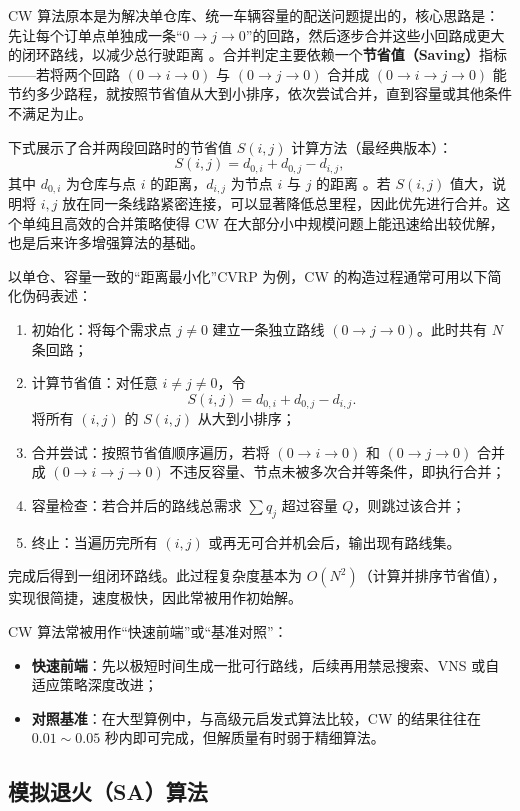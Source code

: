\documentclass[12pt,a4paper,twoside]{ctexbook}
\begin{document}
CW 算法原本是为解决单仓库、统一车辆容量的配送问题提出的，核心思路是：先让每个订单点单独成一条“$0 \to j \to 0$”的回路，然后逐步合并这些小回路成更大的闭环路线，以减少总行驶距离 \cite{golden2008vehicle}。合并判定主要依赖一个\textbf{节省值（Saving）}指标——若将两个回路 $(0 \to i \to 0)$ 与 $(0 \to j \to 0)$ 合并成 $(0 \to i \to j \to 0)$ 能节约多少路程，就按照节省值从大到小排序，依次尝试合并，直到容量或其他条件不满足为止。

下式展示了合并两段回路时的节省值 $S(i,j)$ 计算方法（最经典版本）：
\[
S(i,j) = d_{0,i} + d_{0,j} - d_{i,j},
\]
其中 $d_{0,i}$ 为仓库与点 $i$ 的距离，$d_{i,j}$ 为节点 $i$ 与 $j$ 的距离 \cite{laporte2009fifty}。若 $S(i,j)$ 值大，说明将 $i,j$ 放在同一条线路紧密连接，可以显著降低总里程，因此优先进行合并。这个单纯且高效的合并策略使得 CW 在大部分小中规模问题上能迅速给出较优解，也是后来许多增强算法的基础。

以单仓、容量一致的“距离最小化”CVRP 为例，CW 的构造过程通常可用以下简化伪码表述：
\begin{enumerate}
    \item 初始化：将每个需求点 $j \neq 0$ 建立一条独立路线 $(0 \to j \to 0)$。此时共有 $N$ 条回路；
    \item 计算节省值：对任意 $i \neq j \neq 0$，令
    \[
    S(i,j) = d_{0,i} + d_{0,j} - d_{i,j}.
    \]
    将所有 $(i,j)$ 的 $S(i,j)$ 从大到小排序；
    \item 合并尝试：按照节省值顺序遍历，若将 $(0 \to i \to 0)$ 和 $(0 \to j \to 0)$ 合并成 $(0 \to i \to j \to 0)$ 不违反容量、节点未被多次合并等条件，即执行合并；
    \item 容量检查：若合并后的路线总需求 $\sum q_j$ 超过容量 $Q$，则跳过该合并；
    \item 终止：当遍历完所有 $(i,j)$ 或再无可合并机会后，输出现有路线集。
\end{enumerate}
完成后得到一组闭环路线。此过程复杂度基本为 $O(N^2)$（计算并排序节省值），实现很简捷，速度极快，因此常被用作初始解。

CW 算法常被用作“快速前端”或“基准对照”：
\begin{itemize}
    \item \textbf{快速前端}：先以极短时间生成一批可行路线，后续再用禁忌搜索、VNS 或自适应策略深度改进；
    \item \textbf{对照基准}：在大型算例中，与高级元启发式算法比较，CW 的结果往往在 $0.01 \sim 0.05$ 秒内即可完成，但解质量有时弱于精细算法。
\end{itemize}

\subsection{模拟退火（SA）算法}
\end{document}
